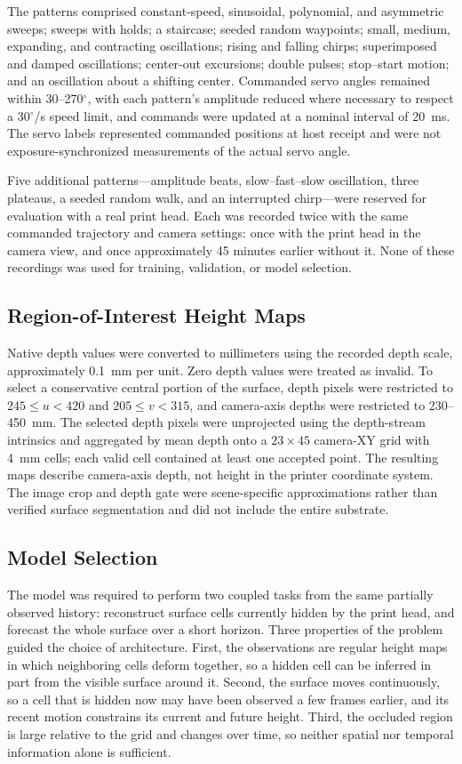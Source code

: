 The patterns comprised constant-speed, sinusoidal, polynomial, and asymmetric sweeps; sweeps with holds; a staircase; seeded random waypoints; small, medium, expanding, and contracting oscillations; rising and falling chirps; superimposed and damped oscillations; center-out excursions; double pulses; stop--start motion; and an oscillation about a shifting center. Commanded servo angles remained within 30--270$^\circ$, with each pattern's amplitude reduced where necessary to respect a 30$^\circ$/s speed limit, and commands were updated at a nominal interval of 20~ms. The servo labels represented commanded positions at host receipt and were not exposure-synchronized measurements of the actual servo angle.

Five additional patterns---amplitude beats, slow--fast--slow oscillation, three plateaus, a seeded random walk, and an interrupted chirp---were reserved for evaluation with a real print head. Each was recorded twice with the same commanded trajectory and camera settings: once with the print head in the camera view, and once approximately 45 minutes earlier without it. None of these recordings was used for training, validation, or model selection.


\subsection{Region-of-Interest Height Maps}
Native depth values were converted to millimeters using the recorded depth scale, approximately 0.1~mm per unit. Zero depth values were treated as invalid. To select a conservative central portion of the surface, depth pixels were restricted to $245 \leq u < 420$ and $205 \leq v < 315$, and camera-axis depths were restricted to 230--450~mm. The selected depth pixels were unprojected using the depth-stream intrinsics and aggregated by mean depth onto a $23 \times 45$ camera-XY grid with 4~mm cells; each valid cell contained at least one accepted point. The resulting maps describe camera-axis depth, not height in the printer coordinate system. The image crop and depth gate were scene-specific approximations rather than verified surface segmentation and did not include the entire substrate.


\subsection{Model Selection}
The model was required to perform two coupled tasks from the same partially observed history: reconstruct surface cells currently hidden by the print head, and forecast the whole surface over a short horizon. Three properties of the problem guided the choice of architecture. First, the observations are regular height maps in which neighboring cells deform together, so a hidden cell can be inferred in part from the visible surface around it. Second, the surface moves continuously, so a cell that is hidden now may have been observed a few frames earlier, and its recent motion constrains its current and future height. Third, the occluded region is large relative to the grid and changes over time, so neither spatial nor temporal information alone is sufficient.


